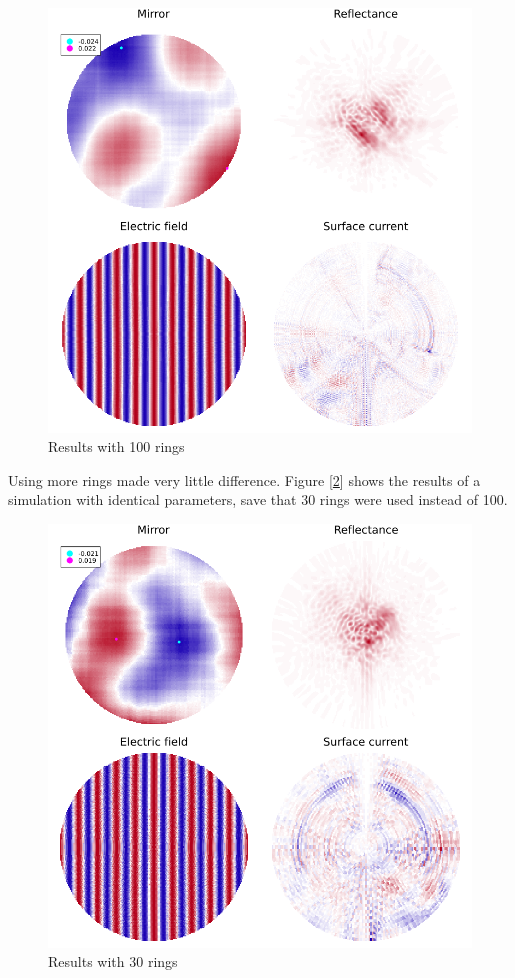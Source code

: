 \documentclass[etd,twoside,senior,noacknowledgments]{BYUPhys}
\begin{document}
\begin{figure}
  \centerline{\includegraphics[width=\textwidth]{100-ring-results}}
  \caption[Results with 100 rings]{\label{fig:100_rings}
    Results with 100 rings}
\end{figure}

Using more rings made very little difference. Figure [\ref{fig:30_rings}] shows the results of a simulation with identical parameters, save that 30 rings were used instead of 100.

\begin{figure}
  \centerline{\includegraphics[width=\textwidth]{30-ring-results}}
  \caption[Results with 30 rings]{\label{fig:30_rings}
    Results with 30 rings}
\end{figure}
\end{document}
